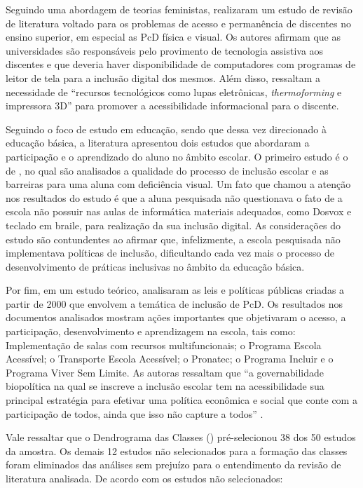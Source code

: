\documentclass{textolivre}
\begin{document}
Seguindo uma abordagem de teorias feministas, \textcite{gesser2017} realizaram um estudo de revisão de literatura voltado para os problemas de acesso e permanência de discentes no ensino superior, em especial as PcD física e visual. Os autores afirmam que as universidades são responsáveis pelo provimento de tecnologia assistiva aos discentes e que deveria haver disponibilidade de computadores com programas de leitor de tela para a inclusão digital dos mesmos. Além disso, \textcite[p. 151]{gesser2017} ressaltam a necessidade de “recursos tecnológicos como lupas eletrônicas, \emph{thermoforming} e impressora 3D” para promover a acessibilidade informacional para o discente.

Seguindo o foco de estudo em educação, sendo que dessa vez direcionado à educação básica, a literatura apresentou dois estudos que abordaram a participação e o aprendizado do aluno no âmbito escolar. O primeiro estudo é o de \textcite{oliva2016}, no qual são analisados a qualidade do processo de inclusão escolar e as barreiras para uma aluna com deficiência visual. Um fato que chamou a atenção nos resultados do estudo é que a aluna pesquisada não questionava o fato de a escola não possuir nas aulas de informática materiais adequados, como Dosvox e teclado em braile, para realização da sua inclusão digital. As considerações do estudo são contundentes ao afirmar que, infelizmente, a escola pesquisada não implementava políticas de inclusão, dificultando cada vez mais o processo de desenvolvimento de práticas inclusivas no âmbito da educação básica.

Por fim, em um estudo teórico, \textcite{kraemer2018} analisaram as leis e políticas públicas criadas a partir de 2000 que envolvem a temática de inclusão de PcD. Os resultados nos documentos analisados mostram ações importantes que objetivaram o acesso, a participação, desenvolvimento e aprendizagem na escola, tais como: Implementação de salas com recursos multifuncionais; o Programa Escola Acessível; o Transporte Escola Acessível; o Pronatec; o Programa Incluir e o Programa Viver Sem Limite. As autoras ressaltam que “a governabilidade biopolítica na qual se inscreve a inclusão escolar tem na acessibilidade sua principal estratégia para efetivar uma política econômica e social que conte com a participação de todos, ainda que isso não capture a todos” \cite[p. 561]{kraemer2018}.

Vale ressaltar que o Dendrograma das Classes () pré-selecionou 38 dos 50 estudos da amostra. Os demais 12 estudos não selecionados para a formação das classes foram eliminados das análises sem prejuízo para o entendimento da revisão de literatura analisada. De acordo com os estudos não selecionados:
\end{document}
